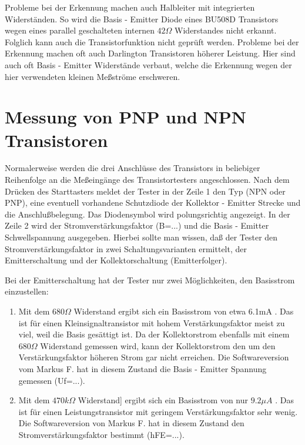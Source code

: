 Probleme bei der Erkennung machen auch Halbleiter mit integrierten Widerständen.
So wird die Basis - Emitter Diode eines BU508D Transistors wegen eines parallel geschalteten internen
\(42 \Omega\) Widerstandes nicht erkannt.
Folglich kann auch die Transistorfunktion nicht geprüft werden.
Probleme bei der Erkennung machen oft auch Darlington Transistoren höherer Leistung. Hier sind auch
oft Basis - Emitter Widerstände verbaut, welche die Erkennung wegen der hier verwendeten kleinen Meßströme erschweren.

\section{Messung von PNP und NPN Transistoren}
Normalerweise werden die drei Anschlüsse des Transistors in beliebiger Reihenfolge an die Meßeingänge des
Transistortesters angeschlossen.
Nach dem Drücken des Starttasters meldet der Tester in der Zeile 1 den Typ (NPN oder PNP), 
eine eventuell vorhandene Schutzdiode der Kollektor - Emitter Strecke und
die Anschlußbelegung. Das Diodensymbol wird  polungsrichtig angezeigt.
In der Zeile 2 wird der Stromverstärkungsfaktor (B=...) und die Basis - Emitter Schwellspannung ausgegeben.
Hierbei sollte man wissen, daß der Tester den Stromverstärkungsfaktor in zwei Schaltungsvarianten 
ermittelt, der Emitterschaltung und der Kollektorschaltung (Emitterfolger).

Bei der Emitterschaltung hat der Tester nur zwei Möglichkeiten, den Basisstrom einzustellen:
\begin{enumerate}
\item Mit dem \(680 \Omega\) Widerstand ergibt sich ein Basisstrom von etwa 6.1mA . Das ist für einen
Kleinsignaltransistor mit hohem Verstärkungsfaktor meist zu viel, weil die Basis gesättigt ist.
Da der Kollektorstrom ebenfalls mit einem \(680 \Omega\) Widerstand gemessen wird, kann der Kollektorstrom
den um den Verstärkungsfaktor höheren Strom gar nicht erreichen. Die Softwareversion vom Markus F. hat
in diesem Zustand die Basis - Emitter Spannung gemessen (Uf=...).\\
\item Mit dem \(470 k\Omega\) Widerstand] ergibt sich ein Basisstrom von nur \(9.2 \mu A\) .
Das ist für einen Leistungstransistor mit geringem Verstärkungsfaktor sehr wenig.
Die Softwareversion von Markus F. hat in diesem Zustand den Stromverstärkungsfaktor bestimmt (hFE=...).\\
\end{enumerate}

